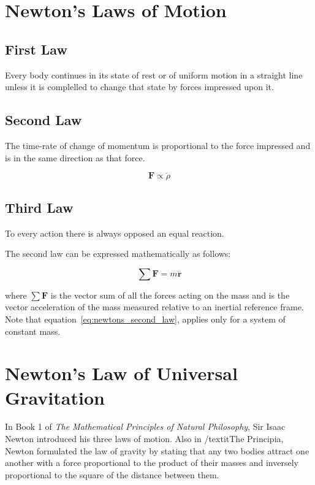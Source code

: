 \documentclass[11pt]{article}
\begin{document}
    \section{Newton's Laws of Motion}

    \subsection{First Law}
    Every body continues in its state of rest or of uniform motion in a straight line unless it is complelled to change that state by forces impressed upon it.

    \subsection{Second Law}
    The time-rate of change of momentum is proportional to the force impressed and is in the same direction as that force.

    \begin{equation}
        \mathbf{F} \propto \dot{\rho}
        \label{eq:newtons_second_law_proportion}
    \end{equation}

    \subsection{Third Law}
    To every action there is always opposed an equal reaction.

    The second law can be expressed mathematically as follows:

    \begin{equation}
        \sum \mathbf{F} = m \ddot{\mathbf{r}}
        \label{eq:newtons_second_law}
    \end{equation}

    where $\sum \mathbf{F}$ is the vector sum of all the forces acting on the mass and is the vector acceleration of the
    mass measured relative to an inertial reference frame. Note that equation\ \ref{eq:newtons_second_law}, applies only for a system of
    constant mass.

    \section{Newton's Law of Universal Gravitation}

    In Book 1 of \textit{The Mathematical Principles of Natural Philosophy}, Sir Isaac Newton introduced his
    three laws of motion. Also in /textit{The Principia}, Newton formulated the law of gravity by stating that
    any two bodies attract one another with a force proportional to the product of their masses and inversely
    proportional to the square of the distance between them.
\end{document}
